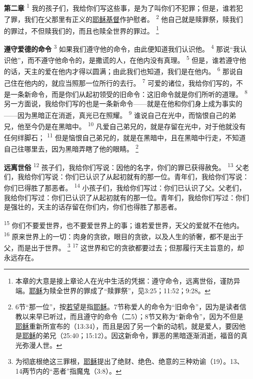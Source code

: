 \begin{multicols}{2}
\textbf{第二章\quad}
\textsuperscript{1}
我的孩子们，我给你们写这些事，是为了叫你们不犯罪；但是，谁若犯了罪，我们在父那里有正义的\uline{耶稣}\uline{基督}作护慰者。
\textsuperscript{2}
他自己就是赎罪祭，赎我们的罪过，不但赎我们的，而且也赎全世界的罪过。
\footnote{本章的大意是接上章论人在光中生活的凭据：遵守命令，远离世俗，谨防异端。\uline{耶稣}为赎全世界的罪成了“赎罪祭”，见3:25；11:52；9:28。}

\textbf{遵守爱德的命令\quad}
\textsuperscript{3}
如果我们遵守他的命令，由此便知道我们认识他。
\textsuperscript{4}
那说“我认识他”，而不遵守他命令的，是撒谎的人，在他内没有真理。
\textsuperscript{5}
但是，谁若遵守他的话，天主的爱在他内才得以圆满；由此我们也知道，我们是在他内。
\textsuperscript{6}
那说自己住在他内的，就应当照那一位所行的去行。
\textsuperscript{7}
可爱的诸位，我给你们写的，不是一条新命令，而是你们从起初领受的旧命令：这旧命令就是你们所听的道理。
\textsuperscript{8}
另一方面说，我给你们写的也是一条新命令——就是在他和你们身上成为事实的——因为黑暗正在消逝，真光已在照耀。
\textsuperscript{9}
谁说自己在光中，而恼恨自己的弟兄，他至今仍是在黑暗中。
\textsuperscript{10}
凡爱自己弟兄的，就是存留在光中，对于他就没有任何绊脚石；
\textsuperscript{11}
但是恼恨自己弟兄的，就是在黑暗中，且在黑暗中行走，不知道自己往哪里去，因为黑暗弄瞎了他的眼睛。
\footnote{6节“那一位”，按\uline{若望}是指\uline{耶稣}。7节称爱人的命令为“旧命令”，因为是读者信教以来早已听过，而且遵守的命令（二5）；8节又称为“新命令”，因为不但是\uline{耶稣}重新所宣布的（13:34），而且是因了另一个新的动机，就是爱人，要因他是\uline{耶稣}的弟兄（25:40；15:12）。因这新命令，罪恶的黑暗逐渐消逝，福音的真光弥漫人世。}

\textbf{远离世俗\quad}
\textsuperscript{12}
孩子们，我给你们写说：因他的名字，你们的罪已获得赦免。
\textsuperscript{13}
父老们，我给你们写说：你们已认识了从起初就有的那一位。青年们，我给你们写说：你们已得胜了那恶者。
\textsuperscript{14}
小孩子们，我给你们写过：你们已认识了父。父老们，我给你们写过：你们已认识了从起初就有的那一位。青年们，我给你们写过：你们是强壮的，天主的话存留在你们内，你们也得胜了那恶者。

\textsuperscript{15}
你们不要爱世界，也不要爱世界上的事；谁若爱世界，天父的爱就不在他内。
\textsuperscript{16}
原来世界上的一切：肉身的贪欲，眼目的贪欲，以及人生的骄奢，都不是出于父，而是出于世界。
\footnote{为彻底根绝这三罪根，\uline{耶稣}提出了绝财、绝色、绝意的三种劝谕（19）。13、14两节内的“恶者”指魔鬼（3:8）。}
\textsuperscript{17}
这世界和它的贪欲都要过去；但那履行天主旨意的，却永远存在。


\end{multicols}
